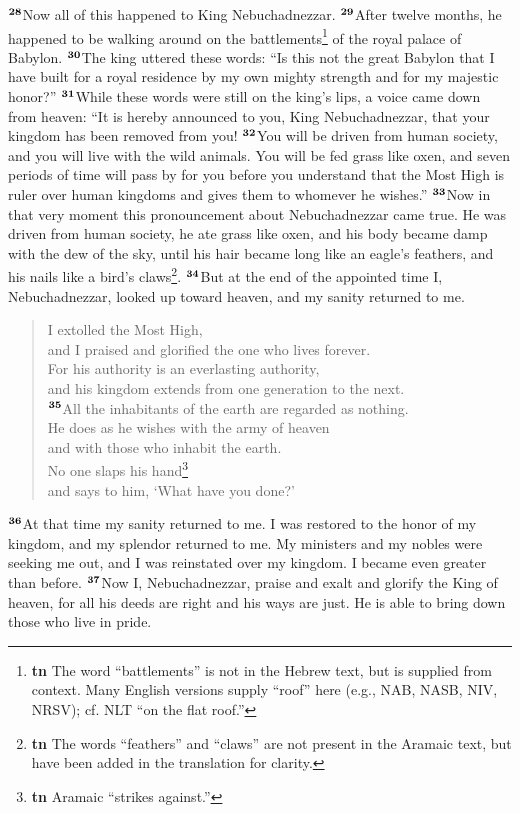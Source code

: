 \documentclass[12pt,a4paper,final]{article}
\renewcommand{\textsuperscript}[1]{\ensuremath{^{\textbf{\scriptsize #1}}}}
\begin{document}
\textsuperscript{28}Now all of this happened to King Nebuchadnezzar. \textsuperscript{29}After twelve months, he happened to be walking around on the battlements\footnote{\textbf{tn} The word “battlements” is not in the Hebrew text, but is supplied from context. Many English versions supply “roof” here (e.g., NAB, NASB, NIV, NRSV); cf. NLT “on the flat roof.”} of the royal palace of Babylon. \textsuperscript{30}The king uttered these words: “Is this not the great Babylon that I have built for a royal residence by my own mighty strength and for my majestic honor?” \textsuperscript{31}While these words were still on the king’s lips, a voice came down from heaven: “It is hereby announced to you, King Nebuchadnezzar, that your kingdom has been removed from you! \textsuperscript{32}You will be driven from human society, and you will live with the wild animals. You will be fed grass like oxen, and seven periods of time will pass by for you before you understand that the Most High is ruler over human kingdoms and gives them to whomever he wishes.” 
\textsuperscript{33}Now in that very moment this pronouncement about Nebuchadnezzar came true. He was driven from human society, he ate grass like oxen, and his body became damp with the dew of the sky, until his hair became long like an eagle’s feathers, and his nails like a bird’s claws\footnote{\textbf{tn} The words “feathers” and “claws” are not present in the Aramaic text, but have been added in the translation for clarity.}. 
\textsuperscript{34}But at the end of the appointed time I, Nebuchadnezzar, looked up toward heaven, and my sanity returned to me. 
\begin{quotation}

\noindent I extolled the Most High, \\
and I praised and glorified the one who lives forever.\\ 
For his authority is an everlasting authority, \\
and his kingdom extends from one generation to the next. \\
\textsuperscript{35}All the inhabitants of the earth are regarded as nothing. \\
He does as he wishes with the army of heaven \\
and with those who inhabit the earth. \\
No one slaps his hand\footnote{\textbf{tn} Aramaic “strikes against.”} \\
and says to him, ‘What have you done?’ \\

\end{quotation}
\textsuperscript{36}At that time my sanity returned to me. I was restored to the honor of my kingdom, and my splendor returned to me. My ministers and my nobles were seeking me out, and I was reinstated over my kingdom. I became even greater than before. \textsuperscript{37}Now I, Nebuchadnezzar, praise and exalt and glorify the King of heaven, for all his deeds are right and his ways are just. He is able to bring down those who live in pride. 
\end{document}
